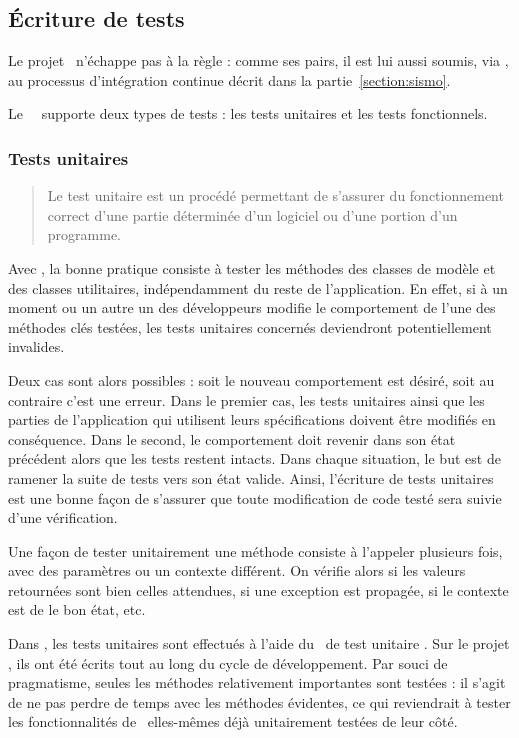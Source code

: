 \subsection{Écriture de tests}

Le projet \aey\ n'échappe pas à la règle : comme ses pairs, il est lui aussi soumis, via \asismo, au processus d'intégration continue décrit dans la partie~\ref{section:sismo}.

Le \afm\ \asf\ supporte deux types de tests : les tests unitaires et les tests fonctionnels.


\subsubsection{Tests unitaires}

\begin{quote}
Le test unitaire est un procédé permettant de s'assurer du fonctionnement correct d'une partie déterminée d'un logiciel ou d'une portion d'un programme.\cite{unit}
\end{quote}

Avec \asf, la bonne pratique consiste à tester les méthodes des classes de modèle et des classes utilitaires, indépendamment du reste de l'application. En effet, si à un moment ou un autre un des développeurs modifie le comportement de l'une des méthodes clés testées, les tests unitaires concernés deviendront potentiellement invalides.

Deux cas sont alors possibles : soit le nouveau comportement est désiré, soit au contraire c'est une erreur. Dans le premier cas, les tests unitaires ainsi que les parties de l'application qui utilisent leurs spécifications doivent être modifiés en conséquence. Dans le second, le comportement doit revenir dans son état précédent alors que les tests restent intacts. Dans chaque situation, le but est de ramener la suite de tests vers son état valide. Ainsi, l'écriture de tests unitaires est une bonne façon de s'assurer que toute modification de code testé sera suivie d'une vérification.

Une façon de tester unitairement une méthode consiste à l'appeler plusieurs fois, avec des paramètres ou un contexte différent. On vérifie alors si les valeurs retournées sont bien celles attendues, si une exception est propagée, si le contexte est de le bon état, etc.

Dans \asf, les tests unitaires sont effectués à l'aide du \afm\ de test unitaire \alime. Sur le projet \aey, ils ont été écrits tout au long du cycle de développement. Par souci de pragmatisme, seules les méthodes relativement importantes sont testées : il s'agit de ne pas perdre de temps avec les méthodes évidentes, ce qui reviendrait à tester les fonctionnalités de \asf\ elles-mêmes déjà unitairement testées de leur côté.

